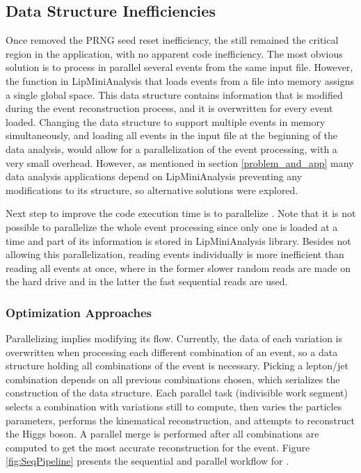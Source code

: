 \subsection{Data Structure Inefficiencies}
\label{data_inef}

Once removed the PRNG seed reset inefficiency, the \ttDilepKinFit still remained the critical region in the application, with no apparent code inefficiency. The most obvious solution is to process in parallel several events from the same input file. However, the function in LipMiniAnalysis that loads events from a file into memory assigns a single global space. This data structure contains information that is modified during the event reconstruction process, and it is overwritten for every event loaded. Changing the data structure to support multiple events in memory simultaneously, and loading all events in the input file at the beginning of the data analysis, would allow for a parallelization of the event processing, with a very small overhead. However, as mentioned in section \ref{problem_and_app} many data analysis applications depend on LipMiniAnalysis preventing any modifications to its structure, so alternative solutions were explored.

Next step to improve the code execution time is to parallelize \ttDilepKinFit. Note that it is not possible to parallelize the whole event processing since only one is loaded at a time and part of its information is stored in LipMiniAnalysis library. Besides not allowing this parallelization, reading events individually is more inefficient than reading all events at once, where in the former slower random reads are made on the hard drive and in the latter the fast sequential reads are used.

\subsubsection{Optimization Approaches}

Parallelizing \ttDilepKinFit implies modifying its flow. Currently, the data of each variation is overwritten when processing each different combination of an event, so a data structure holding all combinations of the event is necessary. Picking a lepton/jet combination depends on all previous combinations chosen, which serializes the construction of the data structure. Each parallel task (indivisible work segment) selects a combination with variations still to compute, then varies the particles parameters, performs the kinematical reconstruction, and attempts to reconstruct the Higgs boson. A parallel merge is performed after all combinations are computed to get the most accurate reconstruction for the event. Figure \ref{fig:SeqPipeline} presents the sequential and parallel workflow for \ttDilepKinFit.

